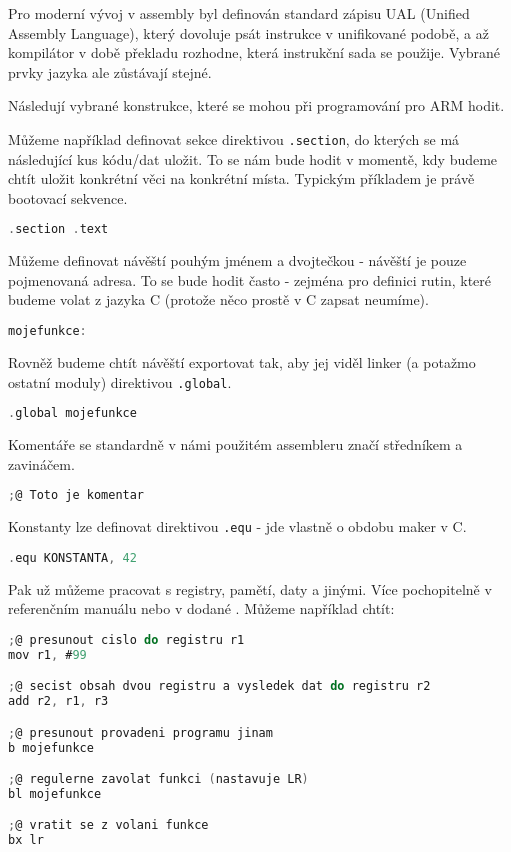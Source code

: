 \documentclass{article}
\begin{document}
Pro moderní vývoj v assembly byl definován standard zápisu UAL (Unified Assembly Language), který dovoluje psát instrukce v unifikované podobě, a až kompilátor v době překladu rozhodne, která instrukční sada se použije. Vybrané prvky jazyka ale zůstávají stejné.

Následují vybrané konstrukce, které se mohou při programování pro ARM hodit.

Můžeme například definovat sekce direktivou \texttt{.section}, do kterých se má následující kus kódu/dat uložit. To se nám bude hodit v momentě, kdy budeme chtít uložit konkrétní věci na konkrétní místa. Typickým příkladem je právě bootovací sekvence.

\begin{lstlisting}[language=C]
.section .text
\end{lstlisting}

Můžeme definovat návěští pouhým jménem a dvojtečkou - návěští je pouze pojmenovaná adresa. To se bude hodit často - zejména pro definici rutin, které budeme volat z jazyka C (protože něco prostě v C zapsat neumíme).

\begin{lstlisting}[language=C]
mojefunkce:
\end{lstlisting}

Rovněž budeme chtít návěští exportovat tak, aby jej viděl linker (a potažmo ostatní moduly) direktivou \texttt{.global}.

\begin{lstlisting}[language=C]
.global mojefunkce
\end{lstlisting}

Komentáře se standardně v námi použitém assembleru značí středníkem a zavináčem.

\begin{lstlisting}[language=C]
;@ Toto je komentar
\end{lstlisting}

Konstanty lze definovat direktivou \texttt{.equ} - jde vlastně o obdobu maker v C.

\begin{lstlisting}[language=C]
.equ KONSTANTA, 42
\end{lstlisting}

Pak už můžeme pracovat s registry, pamětí, daty a jinými. Více pochopitelně v referenčním manuálu nebo v dodané . Můžeme například chtít:

\begin{lstlisting}[language=C]
;@ presunout cislo do registru r1
mov r1, #99

;@ secist obsah dvou registru a vysledek dat do registru r2
add r2, r1, r3

;@ presunout provadeni programu jinam
b mojefunkce

;@ regulerne zavolat funkci (nastavuje LR)
bl mojefunkce

;@ vratit se z volani funkce
bx lr
\end{lstlisting}
\end{document}
